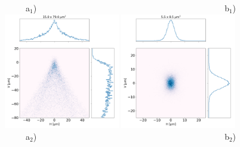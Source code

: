 \documentclass{iucr}              %
\begin{document}
\begin{figure}\label{fig:demagnification}
\flushleft
~~~~~a$_1$)~~~~~~~~~~~~~~~~~~~~~~~~~~~~~~~~~~~~~~~~~~~~~b$_1$) \\
\centering
\includegraphics[width=0.45\textwidth]{figures/M0p2_toroid.png}
\includegraphics[width=0.45\textwidth]{figures/M0p2_diaboloid.png} \\

\flushleft
~~~~~a$_2$)~~~~~~~~~~~~~~~~~~~~~~~~~~~~~~~~~~~~~~~~~~~~~b$_2$) \\
\centering


\end{figure}
\end{document}
